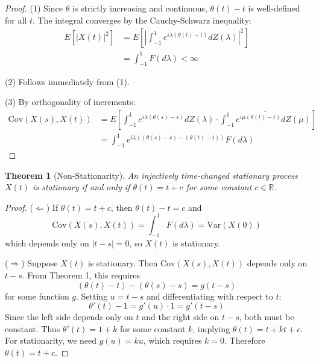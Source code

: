 \documentclass[11pt]{article}
\newtheorem{theorem}{Theorem}
\begin{document}
\begin{proof}
(1) Since $\theta$ is strictly increasing and continuous, $\theta(t)-t$ is well-defined for all $t$. The integral converges by the Cauchy-Schwarz inequality:
\begin{align}
E[|X(t)|^2] &= E\left[\left|\int_{-1}^1 e^{i\lambda(\theta(t)-t)} dZ(\lambda)\right|^2\right]\\
&= \int_{-1}^1 F(d\lambda) < \infty
\end{align}

(2) Follows immediately from (1).

(3) By orthogonality of increments:
\begin{align}
\text{Cov}(X(s),X(t)) &= E\left[\int_{-1}^1 e^{i\lambda(\theta(s)-s)} dZ(\lambda) \cdot \overline{\int_{-1}^1 e^{i\mu(\theta(t)-t)} dZ(\mu)}\right]\\
&= \int_{-1}^1 e^{i\lambda((\theta(s)-s)-(\theta(t)-t))} F(d\lambda)
\end{align}
\end{proof}

\begin{theorem}[Non-Stationarity]
An injectively time-changed stationary process $X(t)$ is stationary if and only if $\theta(t) = t + c$ for some constant $c \in \mathbb{R}$.
\end{theorem}

\begin{proof}
($\Leftarrow$) If $\theta(t) = t + c$, then $\theta(t) - t = c$ and
\begin{equation}
\text{Cov}(X(s),X(t)) = \int_{-1}^1 F(d\lambda) = \text{Var}(X(0))
\end{equation}
which depends only on $|t-s| = 0$, so $X(t)$ is stationary.

($\Rightarrow$) Suppose $X(t)$ is stationary. Then $\text{Cov}(X(s),X(t))$ depends only on $t-s$. From Theorem 1, this requires
\begin{equation}
(\theta(t)-t) - (\theta(s)-s) = g(t-s)
\end{equation}
for some function $g$. Setting $u = t-s$ and differentiating with respect to $t$:
\begin{equation}
\theta'(t) - 1 = g'(u) \cdot 1 = g'(t-s)
\end{equation}
Since the left side depends only on $t$ and the right side on $t-s$, both must be constant. Thus $\theta'(t) = 1 + k$ for some constant $k$, implying $\theta(t) = t + kt + c$. For stationarity, we need $g(u) = ku$, which requires $k = 0$. Therefore $\theta(t) = t + c$.
\end{proof}
\end{document}
